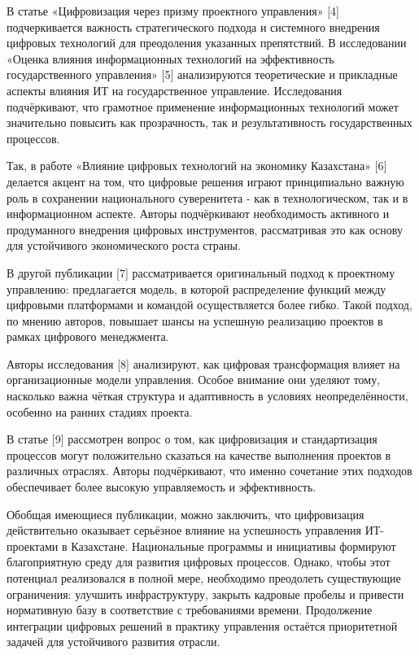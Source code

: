 В статье «Цифровизация через призму проектного управления» {[}4{]}
подчеркивается важность стратегического подхода и системного внедрения
цифровых технологий для преодоления указанных препятствий. В
исследовании «Оценка влияния информационных технологий на эффективность
государственного управления» {[}5{]} анализируются теоретические и
прикладные аспекты влияния ИТ на государственное управление.
Исследования подчёркивают, что грамотное применение информационных
технологий может значительно повысить как прозрачность, так и
результативность государственных процессов.

Так, в работе «Влияние цифровых технологий на экономику Казахстана»
{[}6{]} делается акцент на том, что цифровые решения играют
принципиально важную роль в сохранении национального суверенитета - как
в технологическом, так и в информационном аспекте. Авторы подчёркивают
необходимость активного и продуманного внедрения цифровых инструментов,
рассматривая это как основу для устойчивого экономического роста страны.

В другой публикации {[}7{]} рассматривается оригинальный подход к
проектному управлению: предлагается модель, в которой распределение
функций между цифровыми платформами и командой осуществляется более
гибко. Такой подход, по мнению авторов, повышает шансы на успешную
реализацию проектов в рамках цифрового менеджмента.

Авторы исследования {[}8{]} анализируют, как цифровая трансформация
влияет на организационные модели управления. Особое внимание они уделяют
тому, насколько важна чёткая структура и адаптивность в условиях
неопределённости, особенно на ранних стадиях проекта.

В статье {[}9{]} рассмотрен вопрос о том, как цифровизация и
стандартизация процессов могут положительно сказаться на качестве
выполнения проектов в различных отраслях. Авторы подчёркивают, что
именно сочетание этих подходов обеспечивает более высокую управляемость
и эффективность.

Обобщая имеющиеся публикации, можно заключить, что цифровизация
действительно оказывает серьёзное влияние на успешность управления
ИТ-проектами в Казахстане. Национальные программы и инициативы формируют
благоприятную среду для развития цифровых процессов. Однако, чтобы этот
потенциал реализовался в полной мере, необходимо преодолеть существующие
ограничения: улучшить инфраструктуру, закрыть кадровые пробелы и
привести нормативную базу в соответствие с требованиями времени.
Продолжение интеграции цифровых решений в практику управления остаётся
приоритетной задачей для устойчивого развития отрасли.

